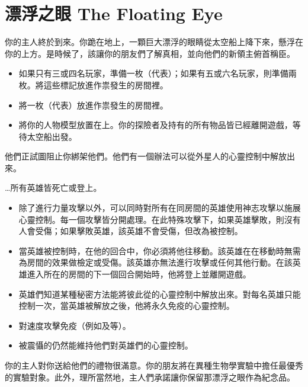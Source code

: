 
\chapter{漂浮之眼 The Floating Eye}

\begin{HauntStory}
  你的主人終於到來。你跪在地上，一顆巨大漂浮的眼睛從太空船上降下來，懸浮在你的上方。是時候了，該讓你的朋友們了解真相，並向他們的新領主俯首稱臣。
\end{HauntStory}

\vspace*{-1em}
\begin{itemize}
  \item 如果只有三或四名玩家，準備一枚（代表）；如果有五或六名玩家，則準備兩枚。將這些標記放進作祟發生的房間裡。
  \item 將一枚（代表）放進作祟發生的房間裡。
  \item 將你的人物模型放置在上。你的探險者及持有的所有物品皆已經離開遊戲，等待太空船出發。
\end{itemize}

他們正試圖阻止你綁架他們。他們有一個辦法可以從外星人的心靈控制中解放出來。

…所有英雄皆死亡或登上。

\vfill\null\pagebreak


\vspace*{-1em}
\begin{itemize}
  \item 除了進行力量攻擊以外，可以同時對所有在同房間的英雄使用神志攻擊以施展心靈控制。每一個攻擊皆分開處理。在此特殊攻擊下，如果英雄擊敗，則沒有人會受傷；如果擊敗英雄，該英雄不會受傷，但改為被控制。
  \item 當英雄被控制時，在他的回合中，你必須將他往移動。該英雄在在移動時無需為房間的效果做檢定或受傷。該英雄亦無法進行攻擊或任何其他行動。在該英雄進入所在的房間的下一個回合開始時，他將登上並離開遊戲。
  \item 英雄們知道某種秘密方法能將彼此從的心靈控制中解放出來。對每名英雄只能控制一次，當英雄被解放之後，他將永久免疫的心靈控制。
  \item {}對速度攻擊免疫（例如及等）。
  \item 被震懾的仍然能維持他們對英雄們的心靈控制。
\end{itemize}

\begin{HauntStory}
  你的主人對你送給他們的禮物很滿意。你的朋友將在異種生物學實驗中擔任最優秀的實驗對象。此外，理所當然地，主人們承諾讓你保留那漂浮之眼作為紀念品。
\end{HauntStory}
